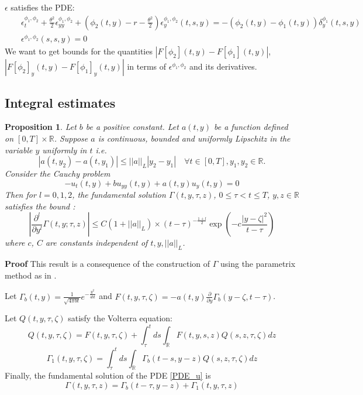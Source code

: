 \documentclass[11pt, psfig]{article}
\newtheorem{proposition}[theorem]{Proposition}
\theoremstyle{definition}
\theoremstyle{remark}
\numberwithin{equation}{section}
\def\sR{\mathbb{R}}
\def\sR{\mathbb{R}}
\newcommand{\be}{\begin{equation}}
\newcommand{\ee}{\end{equation}}
\def \proof{{\noindent \bf Proof}\quad}
\begin{document}
$\epsilon$ satisfies the PDE:
\begin{eqnarray}
&&\epsilon_t^{\phi_1,\phi_2}+\frac{\theta^2}{2}\epsilon_{yy}^{\phi_1,\phi_2}+(\phi_2(t,y)-r-\frac{\theta^2}{2}) \epsilon_y^{\phi_1,\phi_2}(t,s,y) =-(\phi_2(t,y)-\phi_{1}(t,y)) \delta_{y}^{\phi_1}(t,s,y)\\ \label{PDE_epsilon}
&&\epsilon^{\phi_1, \phi_2}(s,s,y) = 0
\end{eqnarray}
We want to get bounds for the quantities $|F[\phi_2](t,y)-F[\phi_1](t,y)|$,  $|F[\phi_2]_y(t,y)-F[\phi_1]_y(t,y)|$ in terms of 
$\epsilon^{\phi_1,\phi_2}$ and its derivatives.

\subsection*{Integral estimates}
\begin{proposition}\label{fundamental}
Let $b$ be a positive constant. Let $a(t,y)$ be a function defined on $[0,T]\times \sR$. Suppose $a$ is continuous, bounded and uniformly Lipschitz in the variable $y$ uniformly in $t$ i.e. $$|a(t,y_2)-a(t,y_1)|\leq ||a||_L |y_2-y_1|\quad \forall t\in [0,T],  y_1, y_2\in \sR.$$
Consider the Cauchy problem
\be \label{PDE_u}
-u_t(t,y)+b u_{yy}(t,y)+a(t,y) u_y(t,y) =0
\ee
Then for $l=0, 1, 2$, the fundamental solution $\Gamma(t, y, \tau, z)$, $0\leq \tau<t\leq T$, $y,z \in \sR$ satisfies the bound :
\be \label{estimate_fundamental}
|\frac{\partial^l}{\partial y^l} \Gamma(t,y; \tau, z) | \leq C (1+||a||_L )\times (t-\tau)^{-\frac{1+l}{2}} \exp(-c\frac{|y-\zeta|^2}{t-\tau})
\ee
where $c$, $C$ are constants independent of $t, y, ||a||_L$.
\end{proposition}
\proof
This result is a consequence of the construction of $\Gamma$ using the parametrix method as in \cite{Ga_Me1}.

Let $\Gamma_b(t,y)=\frac{1}{\sqrt{4\pi b t}} e^{-\frac{y^2}{4b t}}$ and 
$F(t,y,\tau,\zeta) = -a(t,y) \frac{\partial}{\partial y} \Gamma_b(y-\zeta, t-\tau)$. 

Let $Q(t,y,\tau, \zeta)$ satisfy the Volterra equation:
$$
Q(t,y,\tau, \zeta) = F(t,y,\tau,\zeta)+\int_{\tau}^t ds \int_{\sR} F(t,y,s,z) Q(s,z,\tau,\zeta) dz
$$
$$\Gamma_1(t,y,\tau,\zeta) = \int_{\tau}^t ds \int_{\sR} \Gamma_b(t-s, y-z) Q (s,z,\tau, \zeta) dz$$
Finally, the fundamental solution of the PDE \eqref{PDE_u} is
$$\Gamma(t,y, \tau, z)=\Gamma_b(t-\tau, y-z) +\Gamma_1(t,y,\tau,z)$$
\end{document}
